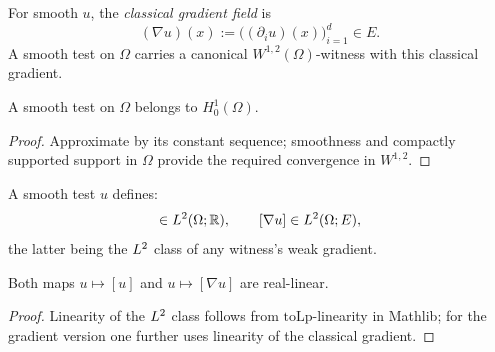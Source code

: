 \begin{definition}
\label{def:smoothGradField}
\leanok
{}
For smooth $u$, the \emph{classical gradient field} is
\begin{equation*}
  (\nabla u)(x) := \bigl((\partial_{i} u)(x)\bigr)_{i=1}^{d} \in E.
\end{equation*}
A smooth test on $\Omega$ carries a canonical $W^{1,2}(\Omega)$-witness with this classical gradient.
\end{definition}

\begin{lemma}
\label{lem:smoothTest_memH01}
\leanok
{}
A smooth test on $\Omega$ belongs to $H^{1}_{0}(\Omega)$.
\end{lemma}

\begin{proof}
\leanok
{}

Approximate by its constant sequence; smoothness and compactly supported support in $\Omega$ provide the required convergence in $W^{1,2}$.
\end{proof}

\begin{definition}
\label{def:smoothFunToLp}
\leanok
{}
A smooth test $u$ defines:
\begin{equation*}
  [u] \in \Lp{2}(\Omega; \R), \qquad [\nabla u] \in \Lp{2}(\Omega; E),
\end{equation*}
the latter being the $L^{2}$ class of any witness's weak gradient.
\end{definition}

\begin{lemma}
\label{lem:smoothFunToLp_zero}
\leanok
{}
Both maps $u \mapsto [u]$ and $u \mapsto [\nabla u]$ are real-linear.
\end{lemma}

\begin{proof}
\leanok
{}

Linearity of the $L^{2}$ class follows from $\mathrm{toLp}$-linearity in Mathlib; for the gradient version one further uses linearity of the classical gradient.
\end{proof}

